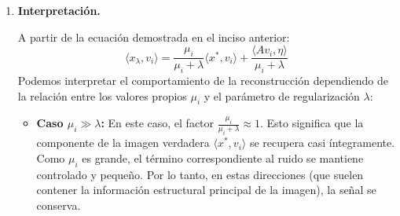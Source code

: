 \documentclass{article}
\begin{document}
\begin{enumerate}[label=\roman*., widest=iv]
  Como los vectores propios \(v_i\) son unitarios, sabemos que \(v_i^Tv_i=\|v_i\|_2^2=1\). Por lo tanto:

  \[
  \|Av_i\|_2=\sqrt{\mu_i}
  \]

  Reemplazando este resultado en la desigualdad anterior, obtenemos:

  \[
  \left|\frac{\langle Av_i,\eta\rangle}{\mu_i+\lambda}\right|
  \leq\frac{\sqrt{\mu_i}\|\eta\|_2}{\mu_i+\lambda}
  \]

  Ahora aplicando la desigualdad \(\mu_i+\lambda\geq 2\sqrt{\mu_i\lambda}\) para acotar el denominador:

  \[
  \begin{aligned}
  \frac{\sqrt{\mu_i}}{\mu_i+\lambda}
  \leq\frac{\sqrt{\mu_i}}{2\sqrt{\mu_i\lambda}}\
  =\frac{1}{2\sqrt{\lambda}}
  \end{aligned}
  \]

  Por lo tanto, sustituyendo esto en la expresión anterior, queda demostrado que:

  \[
  \boxed{
  \left|\frac{\langle Av_i,\eta\rangle}{\mu_i+\lambda}\right|
  \leq\frac{\|\eta\|_2}{2\sqrt{\lambda}}
  }
  \]

  Esta cota depende únicamente de la norma del ruido y del parámetro \(\lambda\), por lo que se mantiene válida sin importar qué tan pequeño sea \(\mu_i\).

  \item \textbf{Interpretación.}

A partir de la ecuación demostrada en el inciso anterior:
\begin{equation*}
    \langle x_\lambda, v_i \rangle = \frac{\mu_i}{\mu_i + \lambda} \langle x^*, v_i \rangle + \frac{\langle A v_i, \eta \rangle}{\mu_i + \lambda}
\end{equation*}
Podemos interpretar el comportamiento de la reconstrucción dependiendo de la relación entre los valores propios $\mu_i$ y el parámetro de regularización $\lambda$:

\begin{itemize}

    \item \textbf{Caso $\mu_i \gg \lambda$:} En este caso, el factor $\frac{\mu_i}{\mu_i + \lambda} \approx 1$. Esto significa que la componente de la imagen verdadera $\langle x^*, v_i \rangle$ se recupera casi íntegramente. Como $\mu_i$ es grande, el término correspondiente al ruido se mantiene controlado y pequeño. Por lo tanto, en estas direcciones (que suelen contener la información estructural principal de la imagen), la señal se conserva.
    

\end{itemize}
\end{enumerate}
\end{document}
